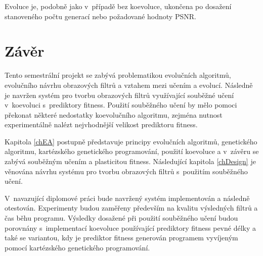 Evoluce je, podobně jako v~případě bez koevoluce, ukončena po dosažení stanoveného počtu generací nebo požadované hodnoty PSNR.

\chapter{Závěr}

Tento semestrální projekt se zabývá problematikou evolučních algoritmů, evolučního návrhu obrazových filtrů a vztahem mezi učením a evolucí. Následně je navržen systém pro tvorbu obrazových filtrů využívající souběžné učení v~koevoluci s~prediktory fitness. Použití souběžného učení by mělo pomoci překonat některé nedostatky koevolučního algoritmu, zejména nutnost experimentálně nalézt nejvhodnější velikost prediktoru fitness.

Kapitola \ref{chEA} postupně představuje principy evolučních algoritmů, genetického algoritmu, kartézského genetického programování, použití koevoluce a v~závěru se zabývá souběžným učením a plasticitou fitness. Následující kapitola \ref{chDesign} je věnována návrhu systému pro tvorbu obrazových filtrů s~použitím souběžného učení.

V~navazující diplomové práci bude navržený systém implementován a následně otestován. Experimenty budou zaměřeny především na kvalitu výsledných filtrů a čas běhu programu. Výsledky dosažené při použití souběžného učení budou porovnány s~implementací koevoluce používající prediktory fitness pevné délky a také se variantou, kdy je prediktor fitness generován programem vyvíjeným pomocí kartézského genetického programování.

